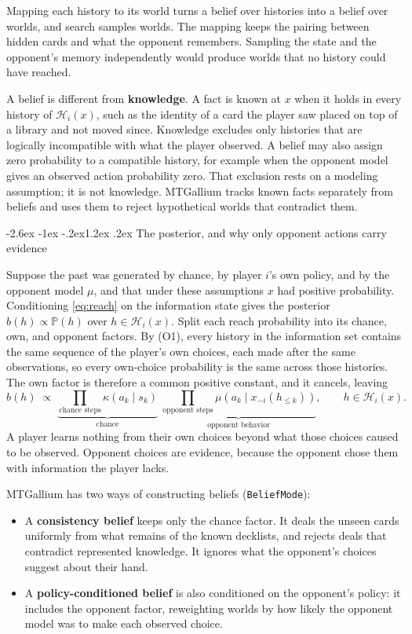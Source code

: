\documentclass[11pt,a4paper]{article}
\makeatletter
\renewcommand\subsection{\@startsection{subsection}{2}{\z@}
  {-2.6ex \@plus -1ex \@minus -.2ex}{1.2ex \@plus .2ex}
  {\normalfont\large\sffamily\bfseries\color{ink}}}
\theoremstyle{plain}
\theoremstyle{definition}
\newcommand{\term}[1]{\textbf{#1}}
\newcommand{\code}[1]{\texttt{\small #1}}
\newcommand{\Hset}{\mathcal H}
\newcommand{\Prob}{\mathbb P}
\makeatother
\begin{document}
Mapping each history to its world turns a belief over histories into a
belief over worlds, and search samples worlds. The mapping keeps the pairing
between hidden cards and what the opponent remembers. Sampling the state and
the opponent's memory independently would produce worlds that no history
could have reached.

A belief is different from \term{knowledge}. A fact is known at $x$ when it
holds in every history of $\Hset_i(x)$, such as the identity of a card the
player saw placed on top of a library and not moved since. Knowledge excludes
only histories that are logically incompatible with what the player observed.
A belief may also assign zero probability to a compatible history, for
example when the opponent model gives an observed action probability zero.
That exclusion rests on a modeling assumption; it is not knowledge. MTGallium
tracks known facts separately from beliefs and uses them to reject
hypothetical worlds that contradict them.

\subsection{The posterior, and why only opponent actions carry evidence}

Suppose the past was generated by chance, by player $i$'s own policy, and by
the opponent model $\mu$, and that under these assumptions $x$ had positive
probability. Conditioning \cref{eq:reach} on the information state gives the
posterior $b(h)\propto\Prob(h)$ over $h\in\Hset_i(x)$. Split each reach
probability into its chance, own, and opponent factors. By (O1), every
history in the information set contains the same sequence of the player's own
choices, each made after the same observations, so every own-choice
probability is the same across those histories. The own factor is therefore a
common positive constant, and it cancels, leaving
\begin{equation}
b(h)\;\propto\;\underbrace{\prod_{\text{chance steps}}\kappa(a_k\mid s_k)}_{\text{chance}}\;
\underbrace{\prod_{\text{opponent steps}}\mu(a_k\mid x_{-i}(h_{\le k}))}_{\text{opponent behavior}},
\qquad h\in\Hset_i(x).
\label{eq:posterior}
\end{equation}
A player learns nothing from their own choices beyond what those choices
caused to be observed. Opponent choices are evidence, because the opponent
chose them with information the player lacks.

MTGallium has two ways of constructing beliefs (\code{BeliefMode}):
\begin{itemize}
\item A \term{consistency belief} keeps only the chance factor. It deals the
  unseen cards uniformly from what remains of the known decklists, and
  rejects deals that contradict represented knowledge. It ignores what the
  opponent's choices suggest about their hand.
\item A \term{policy-conditioned belief} is also conditioned on the
  opponent's policy: it includes the opponent factor, reweighting worlds by
  how likely the opponent model was to make each observed choice.
\end{itemize}
\end{document}
